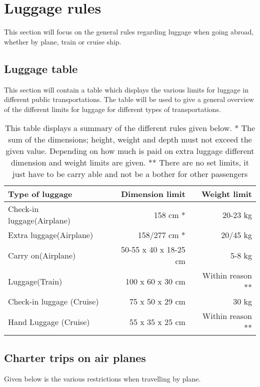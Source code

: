\section{Luggage rules}
\label{sec:LugRules}
This section will focus on the general rules regarding luggage when going abroad, whether by plane, train or cruise ship.
\subsection{Luggage table}
This section will contain a table which displays the various limits for luggage in different public transportations. The table will be used to give a general overview of the different limits for luggage for different types of transportations.
\begin{table}[H]
\begin{tabular}{| l | r | r |}
\hline
Type of luggage &  Dimension limit & Weight limit \\ \hline
Check-in luggage(Airplane) & 158 cm * & 20-23 kg \\ \hline
Extra luggage(Airplane) & 158/277 cm * &  20/45 kg \\ \hline
Carry on(Airplane) & 50-55 x 40 x 18-25 cm & 5-8 kg \\ \hline
Luggage(Train) & 100 x 60 x 30 cm & Within reason **\\ \hline
Check-in luggage (Cruise) & 75 x 50 x 29 cm & 30 kg \\ \hline
Hand Luggage (Cruise) & 55 x 35 x 25 cm & Within reason **\\ \hline
\end{tabular}
\caption{This table displays a summary of the different rules given below.\newline
* The sum of the dimensions; height, weight and depth must not exceed the given value. 
Depending on how much is paid on extra luggage different dimension and weight limits are given.\newline
** There are no set limits, it just have to be carry able and not be a bother for other passengers}
\end{table}

\subsection{Charter trips on air planes}
Given below is the various restrictions when travelling by plane.

